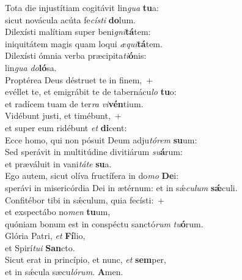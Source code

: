\evenverse Tota die injustítiam cogitávit lin\textit{gua} \textbf{tu}a:~\*\\
\evenverse sicut novácula acúta fe\textit{cí}\textit{sti} \textbf{do}lum.\\
\oddverse Dilexísti malítiam super beni\textit{gni}\textbf{tá}tem:~\*\\
\oddverse iniquitátem magis quam loqui \textit{æ}\textit{qui}\textbf{tá}tem.\\
\evenverse Dilexísti ómnia verba præcipita\textit{ti}\textbf{ó}nis:~\*\\
\evenverse lin\textit{gua} \textit{do}\textbf{ló}sa.\\
\oddverse Proptérea Deus déstruet te in finem,~+\\
\oddverse  evéllet te, et emigrábit te de tabernácu\textit{lo} \textbf{tu}o:~\*\\
\oddverse et radícem tuam de ter\textit{ra} \textit{vi}\textbf{vén}tium.\\
\evenverse Vidébunt justi, et timébunt,~+\\
\evenverse  et super eum ridébunt \textit{et} \textbf{di}cent:~\*\\
\evenverse Ecce homo, qui non pósuit Deum adju\textit{tó}\textit{rem} \textbf{su}um:\\
\oddverse Sed sperávit in multitúdine divitiárum \textit{su}\textbf{á}rum:~\*\\
\oddverse et præváluit in vani\textit{tá}\textit{te} \textbf{su}a.\\
\evenverse Ego autem, sicut olíva fructífera in do\textit{mo} \textbf{De}i:~\*\\
\evenverse sperávi in misericórdia Dei in ætérnum: et in sǽ\textit{cu}\textit{lum} \textbf{sǽ}culi.\\
\oddverse Confitébor tibi in sǽculum, quia fecísti:~+\\
\oddverse  et exspectábo no\textit{men} \textbf{tu}um,~\*\\
\oddverse quóniam bonum est in conspéctu sanctó\textit{rum} \textit{tu}\textbf{ó}rum.\\
\evenverse Glória Patri, \textit{et} \textbf{Fí}lio,~\*\\
\evenverse et Spirí\textit{tu}\textit{i} \textbf{San}cto.\\
\oddverse Sicut erat in princípio, et nunc, \textit{et} \textbf{sem}per,~\*\\
\oddverse et in sǽcula sæcu\textit{ló}\textit{rum}. \textbf{A}men.\\
